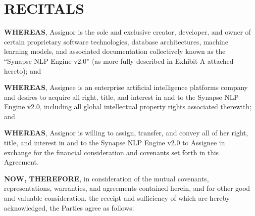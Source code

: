 \section*{RECITALS}

\textbf{WHEREAS}, Assignor is the sole and exclusive creator, developer, and owner of certain proprietary software technologies, database architectures, machine learning models, and associated documentation collectively known as the ``Synapse NLP Engine v2.0'' (as more fully described in Exhibit A attached hereto); and

\textbf{WHEREAS}, Assignee is an enterprise artificial intelligence platforms company and desires to acquire all right, title, and interest in and to the Synapse NLP Engine v2.0, including all global intellectual property rights associated therewith; and

\textbf{WHEREAS}, Assignor is willing to assign, transfer, and convey all of her right, title, and interest in and to the Synapse NLP Engine v2.0 to Assignee in exchange for the financial consideration and covenants set forth in this Agreement.

\textbf{NOW, THEREFORE}, in consideration of the mutual covenants, representations, warranties, and agreements contained herein, and for other good and valuable consideration, the receipt and sufficiency of which are hereby acknowledged, the Parties agree as follows:

